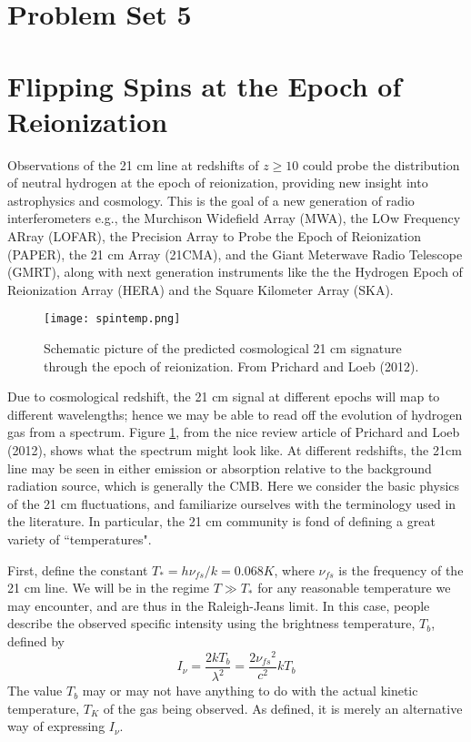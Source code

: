 \documentclass[11pt]{article}
\begin{document}
\pagestyle{empty}

\def\nufs{{\nu_{fs}}}
\section*{\centering Problem Set 5}

\section{Flipping Spins at the Epoch of Reionization}

Observations of the 21 cm line at redshifts of $z\ge10$ could probe the
distribution of neutral hydrogen at the epoch of reionization, providing new
insight into astrophysics and cosmology. This is the goal of a new generation
of radio interferometers e.g., the Murchison Widefield Array (MWA), the LOw
Frequency ARray (LOFAR), the Precision Array to Probe the Epoch of Reionization
(PAPER), the 21 cm Array (21CMA), and the Giant Meterwave Radio Telescope
(GMRT), along with next generation instruments like the 
the Hydrogen Epoch of Reionization Array (HERA) and the
Square Kilometer Array (SKA).

\begin{figure}[!ht]
\texttt{[image: spintemp.png]}
\caption{
Schematic picture of the predicted cosmological 21 cm signature through the
epoch of reionization. From Prichard and Loeb (2012).
}\label{fig:spintemp}
\end{figure}

Due to cosmological redshift, the 21 cm signal at different epochs will map to
different wavelengths; hence we may be able to read off the evolution of
hydrogen gas from a spectrum. Figure \ref{fig:spintemp}, from the nice review article of
Prichard and Loeb (2012), shows what the spectrum might look like. At
different redshifts, the 21cm line may be seen in either emission or absorption
relative to the background radiation source, which is generally the CMB. Here
we consider the basic physics of the 21 cm fluctuations, and familiarize
ourselves with the terminology used in the literature. In particular, the 21 cm
community is fond of defining a great variety of ``temperatures".

First, define the constant $T_*=h\nufs/k=0.068 K$, where $\nufs$ is the
frequency of the 21 cm line. We will be in the regime $T\gg T_*$ for any reasonable
temperature we may encounter, and are thus in the Raleigh-Jeans limit. In this
case, people describe the observed specific intensity using the brightness
temperature, $T_b$, defined by
\begin{equation}
I_\nu=\frac{2kT_b}{\lambda^2}=\frac{2\nufs^2}{c^2}kT_b
\end{equation}
The value $T_b$ may or may not have anything to do with the actual kinetic
temperature, $T_K$ of the gas being observed. As defined, it is merely an
alternative way of expressing $I_\nu$.
\end{document}
